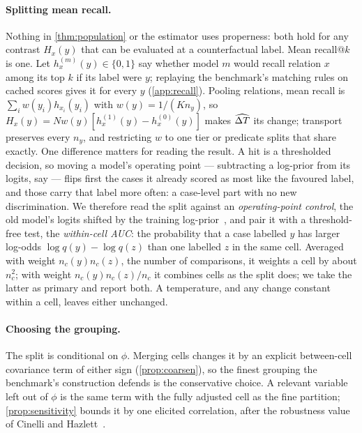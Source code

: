 \paragraph{Splitting mean recall.}\label{sec:hitrate} Nothing in \cref{thm:population} or
the estimator uses properness: both hold for any contrast $H_x(y)$ that can be evaluated at
a counterfactual label. Mean recall@$k$ is one. Let $h^{(m)}_x(y)\in\{0,1\}$ say whether
model $m$ would recall relation $x$ among its top $k$ if its label were $y$; replaying the
benchmark's matching rules on cached scores gives it for every $y$ (\cref{app:recall}).
Pooling relations, mean recall is $\sum_iw(y_i)h_{x_i}(y_i)$ with $w(y)=1/(Kn_y)$, so
$H_x(y)=N w(y)[h^{(1)}_x(y)-h^{(0)}_x(y)]$ makes $\widehat{\Delta T}$ its change; transport preserves every
$n_y$, and restricting $w$ to one tier or predicate splits that share exactly. One
difference matters for reading the result. A hit is a thresholded decision, so moving a
model's operating point --- subtracting a log-prior from its logits, say --- flips first the
cases it already scored as most like the favoured label, and those carry that label more
often: a case-level part with no new discrimination. We therefore read the split against
an \emph{operating-point control}, the old model's logits shifted by the training
log-prior~\cite{menon2021long}, and pair it with a threshold-free test, the
\emph{within-cell AUC}: the probability that a case labelled $y$ has larger log-odds
$\log q(y)-\log q(z)$ than one labelled $z$ in the same cell. Averaged with weight
$n_c(y)n_c(z)$, the number of comparisons, it weights a cell by about $n_c^2$; with weight
$n_c(y)n_c(z)/n_c$ it combines cells as the split does; we take the latter as primary and
report both. A temperature, and any change constant within a cell, leaves either unchanged.

\paragraph{Choosing the grouping.}\label{sec:coarsening} The split is conditional on $\phi$.
Merging cells changes it by an explicit between-cell covariance term of either sign
(\cref{prop:coarsen}), so the finest grouping the benchmark's construction defends is the
conservative choice. A relevant variable left out of $\phi$ is the same term with the fully
adjusted cell as the fine partition; \cref{prop:sensitivity} bounds it by one elicited
correlation, after the robustness value of Cinelli and Hazlett~\cite{cinelli2020making}.

